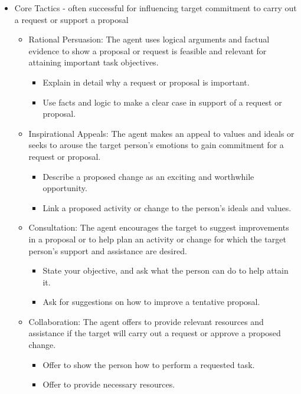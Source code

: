 	\begin{itemize}
		\item Core Tactics  - often successful for influencing target commitment to carry out a request or support a proposal
		\begin{itemize}
			\item Rational Persuasion: The agent uses logical arguments and factual evidence to show a proposal or request is feasible and relevant for attaining important task objectives.
				\begin{itemize}
					\item Explain in detail why a request or proposal is important.
					\item Use facts and logic to make a clear case in support of a request or proposal.
				\end{itemize}
			\item Inspirational Appeals: The agent makes an appeal to values and ideals or seeks to arouse the target person’s emotions to gain commitment for a request or proposal.
				\begin{itemize}
					\item Describe a proposed change as an exciting and worthwhile opportunity.
					\item Link a proposed activity or change to the person’s ideals and values.
				\end{itemize}
			\item Consultation: The agent encourages the target to suggest improvements in a proposal or to help plan an activity or change for which the target person’s support and assistance are desired.
				\begin{itemize}
					\item State your objective, and ask what the person can do to help attain it.
					\item Ask for suggestions on how to improve a tentative proposal.
				\end{itemize}
			\item Collaboration: The agent offers to provide relevant resources and assistance if the target will carry out a request or approve a proposed change.
				\begin{itemize}
					\item Offer to show the person how to perform a requested task.
					\item Offer to provide necessary resources.
				\end{itemize}
		\end{itemize}
		

\end{itemize}

